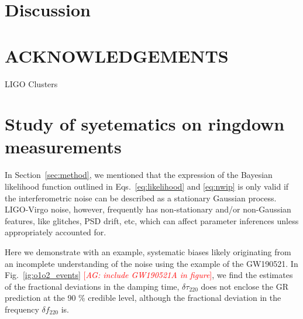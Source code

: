 \documentclass[twocolumn,prd,superscriptaddress,amsfonts,amssymb,amsmath,preprintnumbers]{revtex4-1}
\newcommand{\abhi}[1]{\textcolor{red}{[\textit{AG: #1}]}}
\newcommand{\df}[1]{\delta f_{\text{#1}}}
\newcommand{\dtau}[1]{\delta \tau_{\text{#1}}}
\begin{document}
\section{Discussion}\label{sec:discussion}

\section*{ACKNOWLEDGEMENTS}\label{sec:acknowledgements}
LIGO Clusters

\pagebreak

\appendix
\section{Study of syetematics on ringdown measurements}\label{sec:noise_systematics}

In Section~\ref{sec:method}, we mentioned that the expression of the Bayesian likelihood function outlined in Eqs.~\ref{eq:likelihood} and \ref{eq:nwip} is only valid if the interferometric noise can be described as a stationary Gaussian process. LIGO-Virgo noise, however, frequently has non-stationary and/or non-Gaussian features, like glitches, PSD drift, etc, which can affect parameter inferences unless appropriately accounted for. 

Here we demonstrate with an example, systematic biases likely originating from an incomplete understanding of the noise using the example of the GW190521. In Fig.~\ref{ig:o1o2_events} \abhi{include GW190521A in figure}, we find the estimates of the fractional deviations in the damping time, $\dtau{220}$ does not enclose the GR prediction at the 90 \% credible level, although the fractional deviation in the frequency $\df{220}$ is. 
\end{document}

